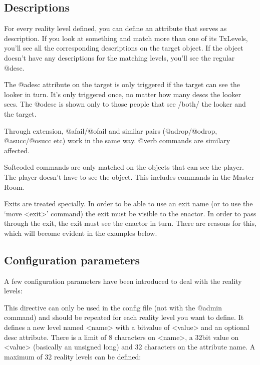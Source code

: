 \documentclass[letterpaper,10pt,english]{sphinxmanual}
\begin{document}
\subsection{Descriptions}
\label{\detokenize{advanced:descriptions}}
\sphinxAtStartPar
For every reality level defined, you can define an attribute that serves as
description. If you look at something and match more than one of its
TxLevels, you’ll see all the corresponding descriptions on the target
object. If the object doesn’t have any descriptions for the matching levels,
you’ll see the regular @desc.

\sphinxAtStartPar
The @adesc attribute on the target is only triggered if the target can see
the looker in turn. It’s only triggered once, no matter how many descs the
looker sees. The @odesc is shown only to those people that see /both/ the
looker and the target.

\sphinxAtStartPar
Through extension, @afail/@ofail and similar pairs (@adrop/@odrop,
@asucc/@osucc etc) work in the same way. @verb commands are similary
affected.

\sphinxAtStartPar
Softcoded commands are only matched on the objects that can see the player.
The player doesn’t have to see the object. This includes commands in the
Master Room.

\sphinxAtStartPar
Exits are treated specially. In order to be able to use an exit name (or to
use the ‘move \textless{}exit\textgreater{}’ command) the exit must be visible to the enactor. In
order to pass through the exit, the exit must see the enactor in turn. There
are reasons for this, which will become evident in the examples below.


\subsection{Configuration parameters}
\label{\detokenize{advanced:configuration-parameters}}
\sphinxAtStartPar
A few configuration parameters have been introduced to deal with the reality
levels:

\begin{sphinxVerbatim}[commandchars=\\\{\}]
   \PYG{p}{[}  \PYG{p}{]}
\end{sphinxVerbatim}

\sphinxAtStartPar
This directive can only be used in the config file (not with the @admin
command) and should be repeated for each reality level you want to define.
It defines a new level named \textless{}name\textgreater{} with a bitvalue of \textless{}value\textgreater{} and an
optional desc attribute. There is a limit of 8 characters on \textless{}name\textgreater{}, a
32\sphinxhyphen{}bit value on \textless{}value\textgreater{} (basically an unsigned long) and 32 characters on
the attribute name. A maximum of 32 reality levels can be defined:
\end{document}
